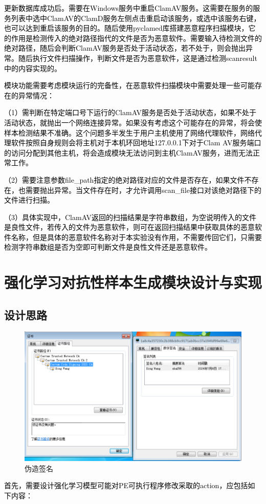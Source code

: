 \textcolor{black}{更新数据库成功后。需要在Windows服务中重启ClamAV服务。这需要在服务的服务列表中选中ClamAV的ClamD服务左侧点击重启动该服务，或选中该服务右键，也可以达到重启该服务的目的。随后使用pyclamed库搭建恶意程序扫描模块，它的作用是检测传入的绝对路径指代的文件是否为恶意软件。需要输入待检测文件的绝对路径，随后会判断ClamAV服务是否处于活动状态，若不处于，则会抛出异常。随后执行文件扫描操作，判断文件是否为恶意软件，这是通过检测scanresult中的内容实现的。}

\textcolor{black}{模块功能需要考虑模块运行的完备性，在恶意软件扫描模块中需要处理一些可能存在的异常情况：}

\textcolor{black}{（1）需判断在特定端口号下运行的ClamAV服务是否处于活动状态，如果不处于活动状态，就抛出一个网络连接异常。如果没有考虑这个可能存在的异常，将会使样本检测结果不准确。这个问题多半发生于用户主机使用了网络代理软件，网络代理软件按照自身规则会将主机对于本机环回地址127.0.0.1下对于Clam AV服务端口的访问分配到其他主机，将会造成模块无法访问到主机ClamAV服务，进而无法正常工作。}

\textcolor{black}{（2）需要注意参数file\_path指定的绝对路径对应的文件是否存在，如果文件不存在，也需要抛出异常。当文件存在时，才允许调用scan\_file接口对该绝对路径下的文件进行扫描。}

\textcolor{black}{（3）具体实现中，ClamAV返回的扫描结果是字符串数组，为空说明传入的文件是良性文件，若传入的文件为恶意软件，则可在返回扫描结果中获取具体的恶意软件名称，但是具体的恶意软件名称对于本实验没有作用，不需要传回它们，只需要检测字符串数组是否为空即可判断文件是良性文件还是恶意软件。}

\section{强化学习对抗性样本生成模块设计与实现}

\subsection{设计思路}

\begin{figure}[htbp]
  \centering
  \includegraphics[]{images/certification_fabrication.png}
  \caption{伪造签名}\label{fig:certification_fabrication}
\end{figure}
\textcolor{black}{首先，需要设计强化学习模型可能对PE可执行程序修改采取的action，应包括如下内容：}

